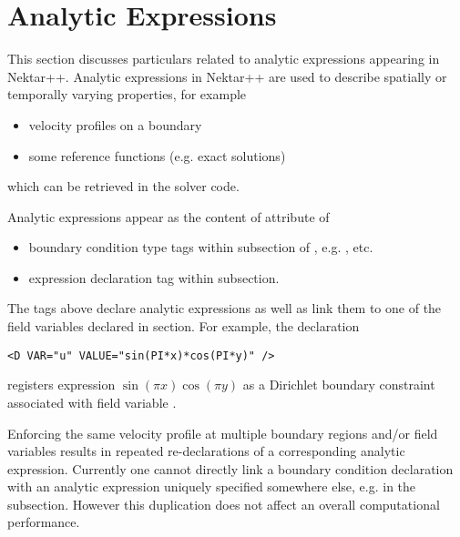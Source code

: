 \section{Analytic Expressions}
\label{sec:xml:analytic-expressions}

This section discusses particulars related to analytic expressions appearing in
Nektar++. Analytic expressions in Nektar++ are used to describe spatially or
temporally varying properties, for example
\begin{itemize}
\item velocity profiles on a boundary
\item some reference functions (e.g. exact solutions)
\end{itemize}
which can be retrieved in the solver code.

Analytic expressions appear as the content of  attribute of
\begin{itemize}
\item boundary condition type tags within  subsection of
 , e.g. ,  etc. 
\item expression declaration tag  within 
subsection.
\end{itemize}

The tags above declare analytic expressions as well as link them to one of the
field variables declared in  section. For example, the
declaration 
\begin{lstlisting}[style=XMLStyle]
  <D VAR="u" VALUE="sin(PI*x)*cos(PI*y)" />
\end{lstlisting}
registers expression $\sin(\pi x)\cos(\pi y)$ as a Dirichlet
boundary constraint associated with field variable .

Enforcing the same velocity profile at multiple boundary regions and/or field
variables results in repeated re-declarations of a corresponding analytic
expression. Currently one cannot directly link a boundary condition declaration
with an analytic expression uniquely specified somewhere else, e.g. in the
 subsection. However this duplication does not affect an
overall computational performance.

% 

